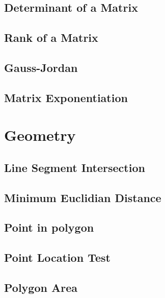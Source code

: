\documentclass[10pt]{article}
\begin{document}
\begin{multicols*}{2}
\subsection{Determinant of a Matrix}


\subsection{Rank of a Matrix}



\subsection{Gauss-Jordan}



\subsection{Matrix Exponentiation}


\section{Geometry}

\subsection{Line Segment Intersection}

\subsection{Minimum Euclidian Distance}

\subsection{Point in polygon}

\subsection{Point Location Test}

\subsection{Polygon Area}


\end{multicols*}
\end{document}
